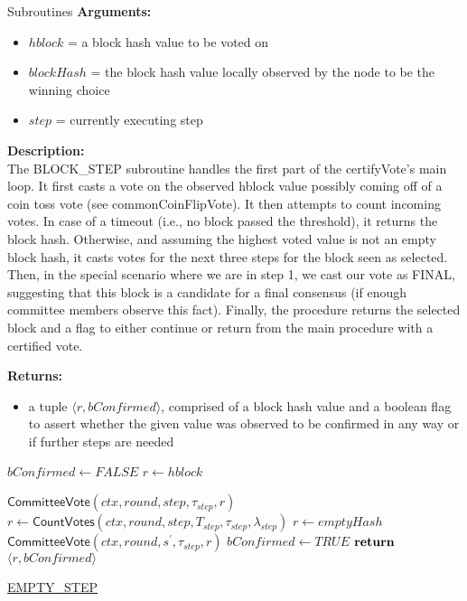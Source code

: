 \documentclass[10pt,a4paper]{article}
\begin{document}
\begin{section}{Subroutines}
\noindent \textbf{Arguments:}
\begin{itemize}
    \item $hblock$ = a block hash value to be voted on
    \item $blockHash$ = the block hash value locally observed by the node to be the winning choice
    \item $step$ = currently executing step
  \end{itemize}

\noindent \textbf{Description:}\\
The BLOCK\_STEP subroutine handles the first part of the certifyVote's main loop.
It first casts a vote on the observed hblock value possibly coming off of a coin toss vote 
(see commonCoinFlipVote).
It then attempts to count incoming votes. In case of a timeout (i.e., no block passed the 
threshold), it returns the block hash.
Otherwise, and assuming the highest voted value is not an empty block hash, it casts votes 
for the next three steps for the block seen as selected.
Then, in the special scenario where we are in step 1, we cast our vote as FINAL, suggesting 
that this block is a candidate for a final consensus (if enough committee members observe 
this fact).
Finally, the procedure returns the selected block and a flag to either continue or return 
from the main procedure with a certified vote.

\noindent \textbf{Returns:}
\begin{itemize}
    \item a tuple $\langle r, bConfirmed \rangle$, comprised of a block hash value and a 
    boolean flag to assert whether the given value was
    observed to be confirmed in any way or if further steps are needed
  \end{itemize}


\begin{algorithm}[H]
    \begin{algorithmic}[H]
        \State $bConfirmed \gets FALSE$
        \State $r \gets hblock$

    \State $\mathsf{CommitteeVote}(ctx, round, step, \tau_{step}, r)$
    \State $r \gets \mathsf{CountVotes}(ctx,round,step,T_{step},\tau_{step},\lambda_{step})$
        \State $r \gets emptyHash$
            \State $\mathsf{CommitteeVote}(ctx, round, s^\prime, \tau_{step}, r)$
        \EndFor
        \State $bConfirmed \gets TRUE$
    \EndIf
    $\Return$ $\langle r, bConfirmed \rangle$
    \EndFunction
    \end{algorithmic}
    \caption{\underline{EMPTY\_STEP}}
\end{algorithm}


\end{section}
\end{document}
